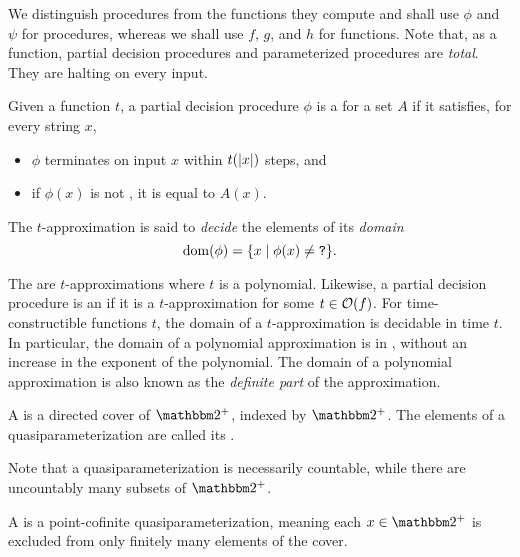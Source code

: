 We distinguish procedures from the functions they compute and shall use $\phi$ and $\psi$ for procedures, whereas we shall use $f$, $g$, and $h$ for functions. %
Note that, as a function, partial decision procedures and parameterized procedures are \emph{total}.
They are halting on every input.

\begin{definition}
  Given a function $t$, a partial decision procedure $\phi$ is a  for a set $A$ if it satisfies, for every string $x$,
  \begin{itemize}
  \item $\phi$ terminates on input $x$ within $t({\lvert x\rvert})$ steps, and
  \item if $\phi(x)$ is not , it is equal to $A(x)$.
  \end{itemize}
  The $t$-approximation is said to \emph{decide} the elements of its \emph{domain}
  \begin{equation*}
    \operatorname{dom}(\phi) = \{x \;{|}\; \phi(x) \neq \textnormal{\texttt{?}}\}.
  \end{equation*}
\end{definition}
The  \parencite{ko1981completeness,balcazar1985bi-immune} are $t$-approximations where $t$ is a polynomial.
Likewise, a partial decision procedure is an  if it is a $t$-approximation for some $t \in \operatorname{\mathcal{O}}(f)$.
For time-constructible functions $t$, the domain of a $t$-approximation is decidable in time $t$.
In particular, the domain of a polynomial approximation is in , without an increase in the exponent of the polynomial.
The domain of a polynomial approximation is also known as the \emph{definite part} of the approximation.

\begin{definition}
  A  is a directed cover of $\binary^+$, indexed by $\binary^+$.
  The elements of a quasiparameterization are called its .
\end{definition}

Note that a quasiparameterization is necessarily countable, while there are uncountably many subsets of $\binary^+$.

\begin{definition}
  A  is a point-cofinite quasiparameterization, meaning each $x \in \binary^+$ is excluded from only finitely many elements of the cover.
\end{definition}

